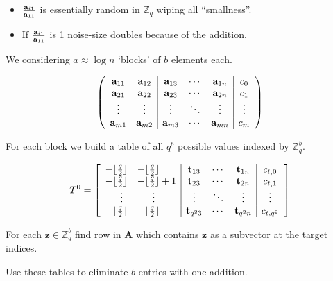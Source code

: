 \documentclass[10pt]{beamer}
\renewcommand{\vec}[1]{\mathbf{#1}\xspace}
\newcommand{\Z}{\ensuremath{\mathbb{Z}}\xspace}
\begin{document}
\begin{frame}
\begin{itemize}
 \item $\frac{\bold{a}_{i1}}{\bold{a}_{11}}$ is essentially random in $\Z_q$ wiping all ``smallness''.
 \item If $\frac{\bold{a}_{i1}}{\bold{a}_{11}}$ is 1 noise-size doubles because of the addition.  
\end{itemize}


\framebreak

We considering $a \approx \log n$ `blocks' of $b$ elements each.

\begin{equation*}
\left(
\begin{array}{cc|ccc|c}
\bold{a}_{11} & \bold{a}_{12} & \bold{a}_{13} & \cdots & \bold{a}_{1n} & c_0\\
\bold{a}_{21} & \bold{a}_{22} & \bold{a}_{23} & \cdots & \bold{a}_{2n} & c_1\\
\vdots & \vdots & \vdots & \ddots & \vdots & \vdots\\
\bold{a}_{m1} & \bold{a}_{m2} & \bold{a}_{m3} & \cdots & \bold{a}_{mn} & c_{m}
\end{array}
\right)
\end{equation*}

\framebreak

For each block we build a table of all $q^b$ possible values indexed by $\Z_q^b$.

\begin{equation*}
T^0 = \left[ 
\begin{array}{ll|ccc|c}
-\lfloor\frac{q}{2}\rfloor & -\lfloor\frac{q}{2}\rfloor & \bold{t}_{13} & \cdots & \bold{t}_{1n} & c_{t,0}\\
-\lfloor\frac{q}{2}\rfloor & -\lfloor\frac{q}{2}\rfloor+1 & \bold{t}_{23} & \cdots & \bold{t}_{2n} & c_{t,1}\\
\phantom{--}\vdots & \phantom{--}\vdots & \vdots & \ddots & \vdots & \vdots\\
\phantom{-}\lfloor\frac{q}{2}\rfloor & \phantom{-}\lfloor\frac{q}{2}\rfloor& \bold{t}_{q^23} & \cdots & \bold{t}_{q^2n} & c_{t,q^2}
\end{array}\right]
\end{equation*}

For each $\vec{z} \in \Z_q^b$ find row in $\vec{A}$ which contains $\vec{z}$ as a subvector at the target indices.

\framebreak

Use these tables to eliminate $b$ entries with one addition.


\end{frame}
\end{document}
